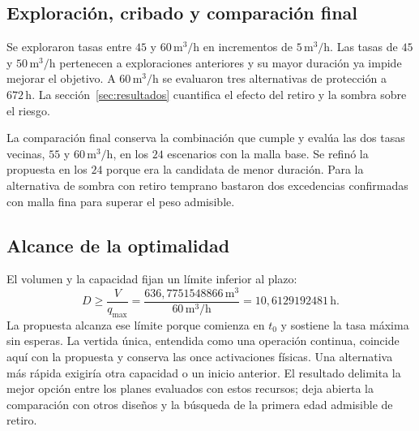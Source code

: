 \subsection{Exploración, cribado y comparación final}
Se exploraron tasas entre $45$ y $60\,\mathrm{m^3/h}$ en incrementos de $5\,\mathrm{m^3/h}$. Las tasas de $45$ y $50\,\mathrm{m^3/h}$ pertenecen a exploraciones anteriores y su mayor duración ya impide mejorar el objetivo. A $60\,\mathrm{m^3/h}$ se evaluaron tres alternativas de protección a $672\,\mathrm h$. La sección~\ref{sec:resultados} cuantifica el efecto del retiro y la sombra sobre el riesgo.

La comparación final conserva la combinación que cumple y evalúa las dos tasas vecinas, $55$ y $60\,\mathrm{m^3/h}$, en los $24$ escenarios con la malla base. Se refinó la propuesta en los $24$ porque era la candidata de menor duración. Para la alternativa de sombra con retiro temprano bastaron dos excedencias confirmadas con malla fina para superar el peso admisible.

\subsection{Alcance de la optimalidad}
El volumen y la capacidad fijan un límite inferior al plazo:
\begin{equation}
  D\geq\frac{V}{q_{\max}}
  =\frac{636{,}7751548866\,\mathrm{m^3}}
  {60\,\mathrm{m^3/h}}
  =10{,}6129192481\,\mathrm h.
  \label{eq:cota-duracion}
\end{equation}
La propuesta alcanza ese límite porque comienza en $t_0$ y sostiene la tasa máxima sin esperas. La vertida única, entendida como una operación continua, coincide aquí con la propuesta y conserva las once activaciones físicas. Una alternativa más rápida exigiría otra capacidad o un inicio anterior. El resultado delimita la mejor opción entre los planes evaluados con estos recursos; deja abierta la comparación con otros diseños y la búsqueda de la primera edad admisible de retiro.

